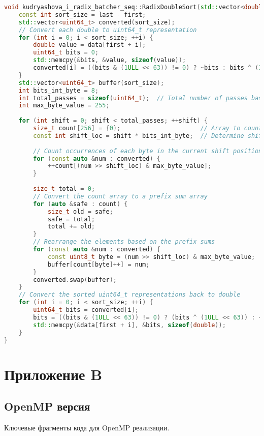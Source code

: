 \documentclass[12pt,a4paper]{extarticle}
\newcommand{\appendixsection}[1]{%
	\clearpage
	\section*{\centering Приложение #1}
	\addcontentsline{toc}{section}{Приложение #1}
}
\begin{document}
\begin{lstlisting}[language=C++]
	void kudryashova_i_radix_batcher_seq::RadixDoubleSort(std::vector<double> &data, int first, int last) {
	const int sort_size = last - first;
	std::vector<uint64_t> converted(sort_size);
	// Convert each double to uint64_t representation
	for (int i = 0; i < sort_size; ++i) {
		double value = data[first + i];
		uint64_t bits = 0;
		std::memcpy(&bits, &value, sizeof(value));
		converted[i] = ((bits & (1ULL << 63)) != 0) ? ~bits : bits ^ (1ULL << 63);  // sign of the number
	}
	std::vector<uint64_t> buffer(sort_size);
	int bits_int_byte = 8;
	int total_passes = sizeof(uint64_t);  // Total number of passes based on uint64_t size
	int max_byte_value = 255;
	
	for (int shift = 0; shift < total_passes; ++shift) {
		size_t count[256] = {0};                      // Array to count occurrences of each byte
		const int shift_loc = shift * bits_int_byte;  // Determine shift for the current pass
		
		// Count occurrences of each byte in the current shift position
		for (const auto &num : converted) {
			++count[(num >> shift_loc) & max_byte_value];
		}
		
		size_t total = 0;
		// Convert the count array to a prefix sum array
		for (auto &safe : count) {
			size_t old = safe;
			safe = total;
			total += old;
		}
		// Rearrange the elements based on the prefix sums
		for (const auto &num : converted) {
			const uint8_t byte = (num >> shift_loc) & max_byte_value;
			buffer[count[byte]++] = num;
		}
		converted.swap(buffer);
	}
	// Convert the sorted uint64_t representations back to double
	for (int i = 0; i < sort_size; ++i) {
		uint64_t bits = converted[i];
		bits = ((bits & (1ULL << 63)) != 0) ? (bits ^ (1ULL << 63)) : ~bits;
		std::memcpy(&data[first + i], &bits, sizeof(double));
	}
}
\end{lstlisting}

\appendixsection{B}
\subsection*{OpenMP версия}
Ключевые фрагменты кода для OpenMP реализации.
\end{document}
